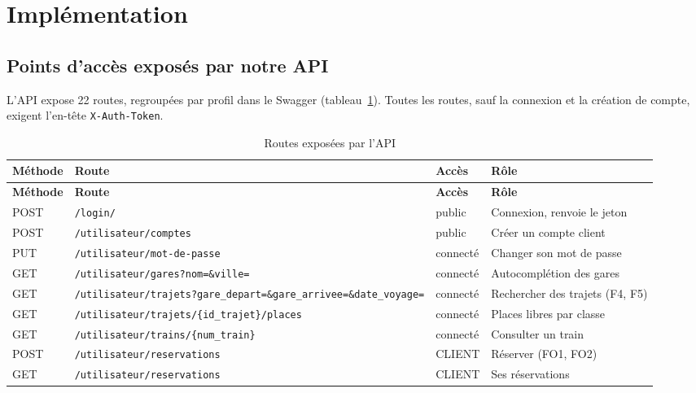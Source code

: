 \documentclass[11pt,a4paper]{article}
\newcommand{\route}[1]{\texttt{#1}}
\newcommand{\code}[1]{\texttt{#1}}
\begin{document}
\clearpage
\section{Implémentation}\label{sec:implementation}

\subsection{Points d'accès exposés par notre API}

L'API expose 22 routes, regroupées par profil dans le Swagger (tableau~\ref{tab:routes}). Toutes les
routes, sauf la connexion et la création de compte, exigent l'en-tête \code{X-Auth-Token}.

\begingroup\footnotesize
\begin{longtable}{@{}l p{7.0cm} l >{\raggedright\arraybackslash}p{3.3cm}@{}}
\caption{Routes exposées par l'API}\label{tab:routes}\\
\toprule
\textbf{Méthode} & \textbf{Route} & \textbf{Accès} & \textbf{Rôle} \\
\midrule
\endfirsthead
\toprule
\textbf{Méthode} & \textbf{Route} & \textbf{Accès} & \textbf{Rôle} \\
\midrule
\endhead
\bottomrule
\endfoot
POST   & \route{/login/}                                    & public        & Connexion, renvoie le jeton \\
POST   & \route{/utilisateur/comptes}                       & public        & Créer un compte client \\
PUT    & \route{/utilisateur/mot-de-passe}                  & connecté      & Changer son mot de passe \\
GET    & \route{/utilisateur/gares?nom=\&ville=}            & connecté      & Autocomplétion des gares \\
GET    & \route{/utilisateur/trajets}\newline\route{?gare\_depart=\&gare\_arrivee=\&date\_voyage=} & connecté & Rechercher des trajets (F4, F5) \\
GET    & \route{/utilisateur/trajets/\{id\_trajet\}/places} & connecté      & Places libres par classe \\
GET    & \route{/utilisateur/trains/\{num\_train\}}         & connecté      & Consulter un train \\
POST   & \route{/utilisateur/reservations}                  & CLIENT        & Réserver (FO1, FO2) \\
GET    & \route{/utilisateur/reservations}                  & CLIENT        & Ses réservations \\

\end{longtable}
\end{document}
